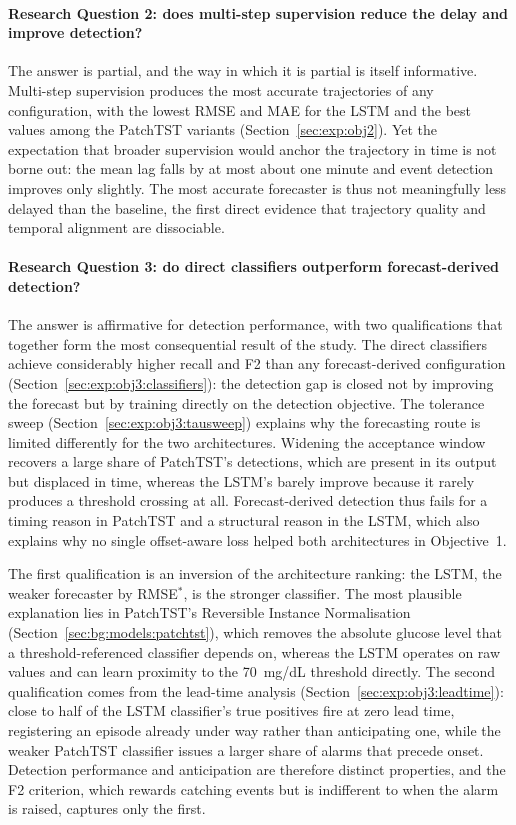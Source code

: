 \paragraph{Research Question 2: does multi-step supervision reduce the delay and improve detection?}
The answer is partial, and the way in which it is partial is itself informative. Multi-step supervision produces the most accurate trajectories of any configuration, with the lowest RMSE and MAE for the LSTM and the best values among the PatchTST variants (Section~\ref{sec:exp:obj2}). Yet the expectation that broader supervision would anchor the trajectory in time is not borne out: the mean lag falls by at most about one minute and event detection improves only slightly. The most accurate forecaster is thus not meaningfully less delayed than the baseline, the first direct evidence that trajectory quality and temporal alignment are dissociable.

\paragraph{Research Question 3: do direct classifiers outperform forecast-derived detection?}
The answer is affirmative for detection performance, with two qualifications that together form the most consequential result of the study. The direct classifiers achieve considerably higher recall and F2 than any forecast-derived configuration (Section~\ref{sec:exp:obj3:classifiers}): the detection gap is closed not by improving the forecast but by training directly on the detection objective. The tolerance sweep (Section~\ref{sec:exp:obj3:tausweep}) explains why the forecasting route is limited differently for the two architectures. Widening the acceptance window recovers a large share of PatchTST's detections, which are present in its output but displaced in time, whereas the LSTM's barely improve because it rarely produces a threshold crossing at all. Forecast-derived detection thus fails for a timing reason in PatchTST and a structural reason in the LSTM, which also explains why no single offset-aware loss helped both architectures in Objective~1.

The first qualification is an inversion of the architecture ranking: the LSTM, the weaker forecaster by RMSE$^*$, is the stronger classifier. The most plausible explanation lies in PatchTST's Reversible Instance Normalisation (Section~\ref{sec:bg:models:patchtst}), which removes the absolute glucose level that a threshold-referenced classifier depends on, whereas the LSTM operates on raw values and can learn proximity to the 70~mg/dL threshold directly. The second qualification comes from the lead-time analysis (Section~\ref{sec:exp:obj3:leadtime}): close to half of the LSTM classifier's true positives fire at zero lead time, registering an episode already under way rather than anticipating one, while the weaker PatchTST classifier issues a larger share of alarms that precede onset. Detection performance and anticipation are therefore distinct properties, and the F2 criterion, which rewards catching events but is indifferent to when the alarm is raised, captures only the first.

